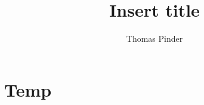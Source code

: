 \documentclass[12pt]{article}
\title{Insert title}
\author{Thomas Pinder}
\begin{document}
    \maketitle
    \section{Temp}
\end{document}
